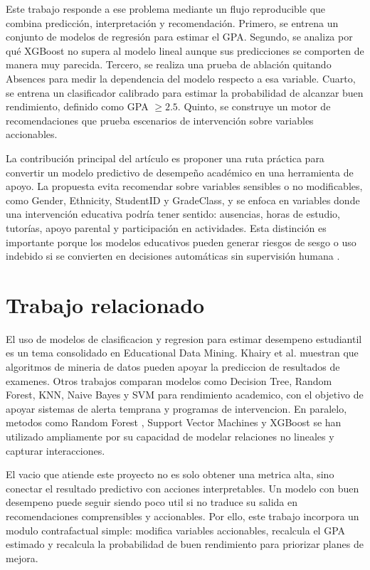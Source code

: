 \documentclass[12pt,onecolumn]{IEEEtran}
\begin{document}
Este trabajo responde a ese problema mediante un flujo reproducible que combina predicción, interpretación y recomendación. Primero, se entrena un conjunto de modelos de regresión para estimar el GPA. Segundo, se analiza por qué XGBoost no supera al modelo lineal aunque sus predicciones se comporten de manera muy parecida. Tercero, se realiza una prueba de ablación quitando Absences para medir la dependencia del modelo respecto a esa variable. Cuarto, se entrena un clasificador calibrado para estimar la probabilidad de alcanzar buen rendimiento, definido como GPA $\geq 2.5$. Quinto, se construye un motor de recomendaciones que prueba escenarios de intervención sobre variables accionables.

La contribución principal del artículo es proponer una ruta práctica para convertir un modelo predictivo de desempeño académico en una herramienta de apoyo. La propuesta evita recomendar sobre variables sensibles o no modificables, como Gender, Ethnicity, StudentID y GradeClass, y se enfoca en variables donde una intervención educativa podría tener sentido: ausencias, horas de estudio, tutorías, apoyo parental y participación en actividades. Esta distinción es importante porque los modelos educativos pueden generar riesgos de sesgo o uso indebido si se convierten en decisiones automáticas sin supervisión humana \cite{hardt2016equality,barocas2023fairness}.

\section{Trabajo relacionado}

El uso de modelos de clasificacion y regresion para estimar desempeno estudiantil es un tema consolidado en Educational Data Mining. Khairy et al. \cite{khairy2024prediction} muestran que algoritmos de mineria de datos pueden apoyar la prediccion de resultados de examenes. Otros trabajos comparan modelos como Decision Tree, Random Forest, KNN, Naive Bayes y SVM para rendimiento academico, con el objetivo de apoyar sistemas de alerta temprana y programas de intervencion. En paralelo, metodos como Random Forest \cite{breiman2001random}, Support Vector Machines \cite{cortes1995support} y XGBoost \cite{chen2016xgboost} se han utilizado ampliamente por su capacidad de modelar relaciones no lineales y capturar interacciones.

El vacio que atiende este proyecto no es solo obtener una metrica alta, sino conectar el resultado predictivo con acciones interpretables. Un modelo con buen desempeno puede seguir siendo poco util si no traduce su salida en recomendaciones comprensibles y accionables. Por ello, este trabajo incorpora un modulo contrafactual simple: modifica variables accionables, recalcula el GPA estimado y recalcula la probabilidad de buen rendimiento para priorizar planes de mejora.
\end{document}
